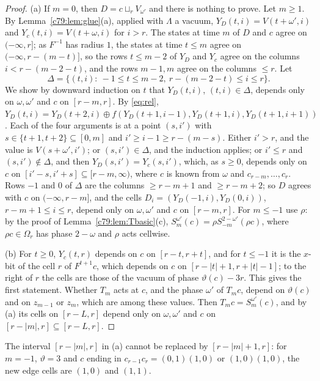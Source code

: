 \begin{proof}
(a) If $m=0$, then $D=c\sqcup_rV_{\omega'}$ and there is nothing to prove. Let $m\ge1$. By Lemma~\ref{c79:lem:glue}(a), applied with $\Lambda$ a vacuum, $Y_D(t,i)=V(t+\omega',i)$ and $Y_c(t,i)=V(t+\omega,i)$ for $i>r$. The states at time $m$ of $D$ and $c$ agree on $(-\infty,r]$; as $F^{-1}$ has radius $1$, the states at time $t\le m$ agree on $(-\infty,r-(m-t)]$, so the rows $t\le m-2$ of $Y_D$ and $Y_c$ agree on the columns $i<r-(m-2-t)$, and the rows $m-1,m$ agree on the columns $\le r$. Let
\[
\Delta=\{(t,i):\ -1\le t\le m-2,\ r-(m-2-t)\le i\le r\}.
\]
We show by downward induction on $t$ that $Y_D(t,i)$, $(t,i)\in\Delta$, depends only on $\omega,\omega'$ and $c$ on $[r-m,r]$. By \eqref{eq:rel}, $Y_D(t,i)=Y_D(t+2,i)\oplus f(Y_D(t+1,i-1),Y_D(t+1,i),Y_D(t+1,i+1))$. Each of the four arguments is at a point $(s,i')$ with $s\in\{t+1,t+2\}\subseteq[0,m]$ and $i'\ge i-1\ge r-(m-s)$. Either $i'>r$, and the value is $V(s+\omega',i')$; or $(s,i')\in\Delta$, and the induction applies; or $i'\le r$ and $(s,i')\notin\Delta$, and then $Y_D(s,i')=Y_c(s,i')$, which, as $s\ge0$, depends only on $c$ on $[i'-s,i'+s]\subseteq[r-m,\infty)$, where $c$ is known from $\omega$ and $c_{r-m},\dots,c_r$. Rows $-1$ and $0$ of $\Delta$ are the columns $\ge r-m+1$ and $\ge r-m+2$; so $D$ agrees with $c$ on $(-\infty,r-m]$, and the cells $D_i=(Y_D(-1,i),Y_D(0,i))$, $r-m+1\le i\le r$, depend only on $\omega,\omega'$ and $c$ on $[r-m,r]$. For $m\le-1$ use $\rho$: by the proof of Lemma~\ref{c79:lem:Tbasic}(c), $S^{\omega'}_m(c)=\rho S^{2-\omega'}_{-m}(\rho c)$, where $\rho c\in\Omega_r$ has phase $2-\omega$ and $\rho$ acts cellwise.

(b) For $t\ge0$, $Y_c(t,r)$ depends on $c$ on $[r-t,r+t]$, and for $t\le-1$ it is the $x$-bit of the cell $r$ of $F^{t+1}c$, which depends on $c$ on $[r-|t|+1,r+|t|-1]$; to the right of $r$ the cells are those of the vacuum of phase $\vartheta(c)-3r$. This gives the first statement. Whether $T_m$ acts at $c$, and the phase $\omega'$ of $T_mc$, depend on $\vartheta(c)$ and on $z_{m-1}$ or $z_m$, which are among these values. Then $T_mc=S^{\omega'}_m(c)$, and by (a) its cells on $[r-L,r]$ depend only on $\omega,\omega'$ and $c$ on $[r-|m|,r]\subseteq[r-L,r]$.
\end{proof}

The interval $[r-|m|,r]$ in (a) cannot be replaced by $[r-|m|+1,r]$: for $m=-1$, $\vartheta=3$ and $c$ ending in $c_{r-1}c_r=(0,1)(1,0)$ or $(1,0)(1,0)$, the new edge cells are $(1,0)$ and $(1,1)$.

